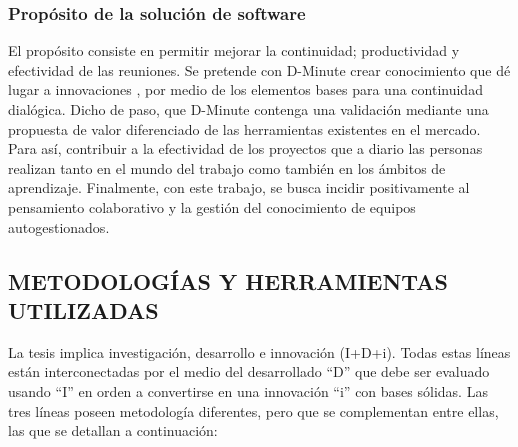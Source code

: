 \subsubsection{Propósito de la solución de software}

El propósito consiste en permitir mejorar la continuidad; productividad y efectividad de las reuniones. Se pretende con D-Minute crear conocimiento que dé lugar a innovaciones , por medio de los elementos bases para una continuidad dialógica. Dicho de paso, que D-Minute contenga una validación mediante una propuesta de valor diferenciado de las herramientas existentes en el mercado. Para así, contribuir a la efectividad de los proyectos que a diario las personas realizan tanto en el mundo del trabajo como también en los ámbitos de aprendizaje. Finalmente, con este trabajo, se busca incidir positivamente al pensamiento colaborativo y la gestión del conocimiento de equipos autogestionados.

\subsection{METODOLOGÍAS Y HERRAMIENTAS UTILIZADAS}

La tesis implica investigación, desarrollo e innovación (I+D+i). Todas estas líneas están interconectadas por el medio del desarrollado “D” que debe ser evaluado usando “I” en orden a convertirse en una innovación “i” con bases sólidas. Las tres líneas poseen metodología diferentes, pero que se complementan entre ellas, las que se detallan a continuación:

